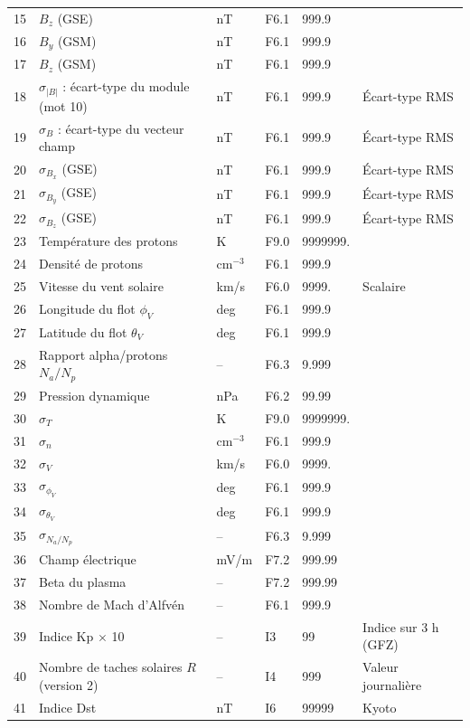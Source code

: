 \begin{longtable}{r p{5.0cm} p{2.0cm} l l p{3.3cm}}
15 & $B_z$ (GSE) & nT & F6.1 & 999.9 & \\
16 & $B_y$ (GSM) & nT & F6.1 & 999.9 & \\
17 & $B_z$ (GSM) & nT & F6.1 & 999.9 & \\
18 & $\sigma_{|B|}$ : écart-type du module (mot 10) & nT & F6.1 & 999.9 & Écart-type RMS \\
19 & $\sigma_B$ : écart-type du vecteur champ & nT & F6.1 & 999.9 & Écart-type RMS \\
20 & $\sigma_{B_x}$ (GSE) & nT & F6.1 & 999.9 & Écart-type RMS \\
21 & $\sigma_{B_y}$ (GSE) & nT & F6.1 & 999.9 & Écart-type RMS \\
22 & $\sigma_{B_z}$ (GSE) & nT & F6.1 & 999.9 & Écart-type RMS \\
23 & Température des protons & K & F9.0 & 9999999. & \\
24 & Densité de protons & cm$^{-3}$ & F6.1 & 999.9 & \\
25 & Vitesse du vent solaire & km/s & F6.0 & 9999. & Scalaire \\
26 & Longitude du flot $\phi_V$ & deg & F6.1 & 999.9 & \\
27 & Latitude du flot $\theta_V$ & deg & F6.1 & 999.9 & \\
28 & Rapport alpha/protons $N_a/N_p$ & -- & F6.3 & 9.999 & \\
29 & Pression dynamique & nPa & F6.2 & 99.99 & \\
30 & $\sigma_T$ & K & F9.0 & 9999999. & \\
31 & $\sigma_n$ & cm$^{-3}$ & F6.1 & 999.9 & \\
32 & $\sigma_V$ & km/s & F6.0 & 9999. & \\
33 & $\sigma_{\phi_V}$ & deg & F6.1 & 999.9 & \\
34 & $\sigma_{\theta_V}$ & deg & F6.1 & 999.9 & \\
35 & $\sigma_{N_a/N_p}$ & -- & F6.3 & 9.999 & \\
36 & Champ électrique & mV/m & F7.2 & 999.99 & \\
37 & Beta du plasma & -- & F7.2 & 999.99 & \\
38 & Nombre de Mach d'Alfvén & -- & F6.1 & 999.9 & \\
39 & Indice Kp $\times$ 10 & -- & I3 & 99 & Indice sur 3 h (GFZ) \\
40 & Nombre de taches solaires $R$ (version 2) & -- & I4 & 999 & Valeur journalière \\
41 & Indice Dst & nT & I6 & 99999 & Kyoto \\

\end{longtable}
